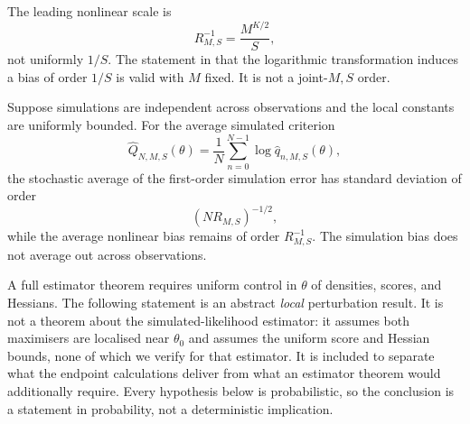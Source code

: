 \documentclass[11pt]{article}
\theoremstyle{definition}
\newcommand{\thetao}{\theta_0}
\begin{document}
The leading nonlinear scale is
\begin{equation}\label{eq:log_bias_order}
R_{M,S}^{-1}=\frac{M^{K/2}}{S},
\end{equation}
not uniformly $1/S$. The statement in \citet[p.~171]{BrandtSantaClara2002} that the logarithmic transformation induces a bias of order $1/S$ is valid with $M$ fixed. It is not a joint-$M,S$ order.

Suppose simulations are independent across observations and the local constants are uniformly bounded. For the average simulated criterion
\[
\widehat Q_{N,M,S}(\theta)
=\frac1N\sum_{n=0}^{N-1}
\log\widehat q_{n,M,S}(\theta),
\]
the stochastic average of the first-order simulation error has standard deviation of order
\[
(NR_{M,S})^{-1/2},
\]
while the average nonlinear bias remains of order $R_{M,S}^{-1}$. The simulation bias does not average out across observations.

A full estimator theorem requires uniform control in $\theta$ of densities, scores, and Hessians. The following statement is an abstract \emph{local} perturbation result. It is not a theorem about the simulated-likelihood estimator: it assumes both maximisers are localised near $\thetao$ and assumes the uniform score and Hessian bounds, none of which we verify for that estimator. It is included to separate what the endpoint calculations deliver from what an estimator theorem would additionally require. Every hypothesis below is probabilistic, so the conclusion is a statement in probability, not a deterministic implication.
\end{document}
